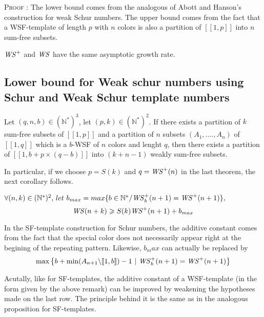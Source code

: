 \textsc{Proof :} The lower bound comes from the analogous of Abott and Hanson's construction for weak Schur numbers.
The upper bound comes from the fact that a WSF-template of length \(p\) with \(n\) colors is also a partition of
\([\![1, p]\!]\) into \(n\) sum-free subsets.

\begin{remark}
	\(\mathit{WS}^+\) and \(\mathit{WS}\) have the same asymptotic growth rate.
\end{remark}


\subsection{Lower bound for Weak schur numbers using Schur and Weak Schur template numbers}


\begin{theorem}
Let \((q,n,b) \in (\mathbb{N}^*)^3\), let \( (p,k) \in (\mathbb{N}^*)^2\). If there exists a partition of \(k\)
sum-free subsets of \([\![1,p]\!]\) and a partition of \(n\) subsets \((A_1,....,A_n)\) of \([\![1, q]\!]\) which is a
\(b\)-WSF of \(n\) colors and lenght \(q\),
 then there exists a partition of \([\![1, b+p \times (q-b)]\!]\) into \((k+n-1)\) weakly sum-free subsets.
\end{theorem}

In particular, if we choose \(p = S(k)\) and \(q = \mathit{WS}^+(n)\) in the last theorem, the next corollary follows.


\begin{corollary}
\( \forall (n,k) \in (\mathbb{N}^*)^2 \text{, } let ~ b_{max}=max \{b\in \mathbb{N}^*/ \mathit{WS}_b^+(n+1) = \mathit{WS}^+(n+1)\},\) \[
\mathit{WS}(n+k) \geqslant S(k) \mathit{WS}^+(n+1)+b_{max}\]
\end{corollary}

\begin{remark}
In the SF-template construction for Schur numbers, the additive constant comes from the fact that the special color does
not necessarily appear right at the begining of the repeating pattern. Likewise, \(b_max\) can actually be replaced by \\
\[\max \left\{ b + \min (A_{n+1} \backslash [\![1, b ]\!]) - 1~|~ \mathit{WS}_b^+(n+1) = \mathit{WS}^+(n+1) \right\}\]
\end{remark}

\begin{remark}
Acutally, like for SF-templates, the additive constant of a WSF-template (in the form given by the above remark) can be improved
by weakening the hypotheses made on the last row. The principle behind it is the same as in the analogous proposition for SF-templates.
\end{remark}


